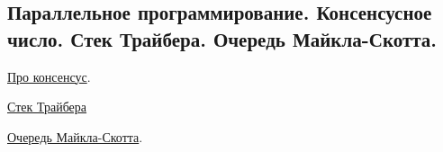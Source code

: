 \subsection{Параллельное программирование. Консенсусное число. Стек Трайбера. Очередь Майкла-Скотта.}

\href{https://www.babichev.org/tpmtp/Lecture09.pdf}{Про консенсус}.

\href{https://neerc.ifmo.ru/wiki/index.php?title=%D0%A1%D1%82%D0%B5%D0%BA_%D0%A2%D1%80%D0%B0%D0%B9%D0%B1%D0%B5%D1%80%D0%B0}{Стек Трайбера}

\href{https://neerc.ifmo.ru/wiki/index.php?title=%D0%9E%D1%87%D0%B5%D1%80%D0%B5%D0%B4%D1%8C_%D0%9C%D0%B0%D0%B9%D0%BA%D0%BB%D0%B0_%D0%B8_%D0%A1%D0%BA%D0%BE%D1%82%D1%82%D0%B0}{Очередь Майкла-Скотта}.